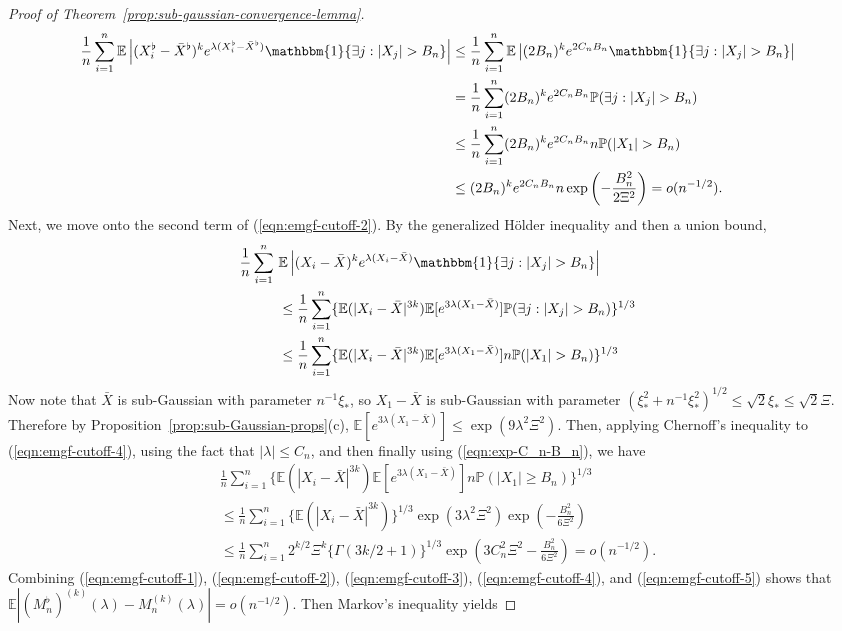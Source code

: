 \documentclass{article}
\theoremstyle{definition}
\newcommand{\E}{\mathbb{E}}
\newcommand{\1}{\mathbbm{1}}
\renewcommand{\P}{\mathbb{P}}
\begin{document}
\begin{proof}[Proof of Theorem~\ref{prop:sub-gaussian-convergence-lemma}]
    \begin{align}
        \frac1n\sum_{i=1}^n \E\left|(X^\flat_i - \bar X^\flat)^ke^{\lambda (X_i^\flat - \bar X^\flat)}\1\{\exists j: |X_j| > B_n\}\right|  
        &\leq \frac1n\sum_{i=1}^n \E\left|(2B_n)^ke^{2C_nB_n}\1\{\exists j: |X_j| > B_n\}\right| \notag \\
        &= \frac1n\sum_{i=1}^n (2B_n)^ke^{2C_nB_n}\P(\exists j: |X_j| > B_n) \notag\\
        &\leq \frac1n\sum_{i=1}^n (2B_n)^ke^{2C_nB_n}n\P(|X_1| > B_n)  \notag \\&\leq(2B_n)^ke^{2C_nB_n}n\exp\left(-\frac{B_n^2}{2\Xi^2}\right) = o(n^{-1/2}).
        \label{eqn:emgf-cutoff-3}
    \end{align}
    Next, we move onto the second term of (\ref{eqn:emgf-cutoff-2}). By the generalized H\"older inequality and then a union bound,
    \begin{align}
        \frac1n\sum_{i=1}^n \ &\E\left|(X_i - \bar X)^ke^{\lambda (X_i - \bar X)}\1\{\exists j: |X_j| > B_n\}\right| \notag \\ &\leq \frac1n\sum_{i=1}^n \{\E(|X_i - \bar X|^{3k})\E[e^{3\lambda(X_1 - \bar X)}]\P(\exists j: |X_j| > B_n)\}^{1/3} \notag\\
        &\leq \frac1n\sum_{i=1}^n \{\E(|X_i - \bar X|^{3k})\E[e^{3\lambda(X_1 - \bar X)}]n\P(|X_1| > B_n)\}^{1/3}
        \label{eqn:emgf-cutoff-4}
    \end{align}
    Now note that $\bar X$ is sub-Gaussian with parameter $n^{-1}\xi_*$, so $X_1 - \bar X$ is sub-Gaussian with parameter $(\xi_*^2 + n^{-1}\xi_*^2)^{1/2} \leq \sqrt 2 \xi_* \leq \sqrt 2 \Xi$. Therefore by Proposition~\ref{prop:sub-Gaussian-props}(c), $\E[e^{3\lambda(X_1 - \bar X)}] \leq \exp(9\lambda^2\Xi^2)$. Then, applying Chernoff's inequality to (\ref{eqn:emgf-cutoff-4}), using the fact that $|\lambda| \leq C_n$, and then finally using (\ref{eqn:exp-C_n-B_n}), we have 
    \begin{multline}
         \frac1n\sum_{i=1}^n \{\E(|X_i - \bar X|^{3k})\E[e^{3\lambda(X_1 - \bar X)}]n\P(|X_1| \geq B_n)\}^{1/3} \\ \leq   \frac1n\sum_{i=1}^n\{\E(|X_i - \bar X|^{3k})\}^{1/3}\exp(3\lambda^2\Xi^2)\exp\left(-\frac{B_n^2}{6\Xi^2}\right) \\ 
 \leq \frac1n\sum_{i=1}^n 2^{k/2}\Xi^k\{\Gamma(3k/2+1)\}^{1/3}\exp\left(3C_n^2\Xi^2 - \frac{B_n^2}{6\Xi^2}\right) 
 = o(n^{-1/2}).
 \label{eqn:emgf-cutoff-5}
    \end{multline}
    Combining (\ref{eqn:emgf-cutoff-1}), (\ref{eqn:emgf-cutoff-2}), (\ref{eqn:emgf-cutoff-3}), (\ref{eqn:emgf-cutoff-4}), and (\ref{eqn:emgf-cutoff-5}) shows that $\E|(M_n^\flat)^{(k)}(\lambda) - M_n^{(k)}(\lambda)| = o(n^{-1/2})$. Then Markov's inequality yields 

\end{proof}
\end{document}
